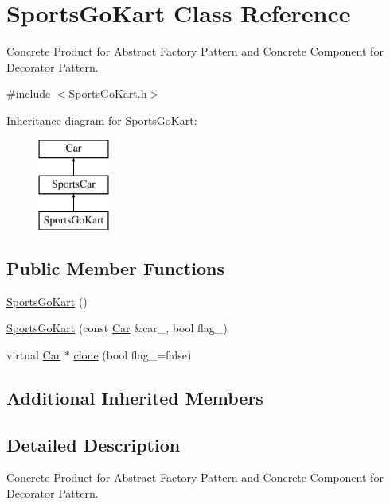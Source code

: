 \hypertarget{class_sports_go_kart}{}\section{Sports\+Go\+Kart Class Reference}
\label{class_sports_go_kart}


Concrete Product for Abstract Factory Pattern and Concrete Component for Decorator Pattern.  




{\ttfamily \#include $<$Sports\+Go\+Kart.\+h$>$}

Inheritance diagram for Sports\+Go\+Kart\+:\begin{figure}[H]
\begin{center}
\leavevmode
\includegraphics[height=3.000000cm]{class_sports_go_kart}
\end{center}
\end{figure}
\subsection*{Public Member Functions}
\begin{DoxyCompactItemize}
\item 
\mbox{\hyperlink{class_sports_go_kart_af94667e853606eda8def4ebe200e770c}{Sports\+Go\+Kart}} ()
\item 
\mbox{\hyperlink{class_sports_go_kart_a240ef3c603140c844f1a0fb8becd19be}{Sports\+Go\+Kart}} (const \mbox{\hyperlink{class_car}{Car}} \&car\+\_\+, bool flag\+\_\+)
\item 
virtual \mbox{\hyperlink{class_car}{Car}} $\ast$ \mbox{\hyperlink{class_sports_go_kart_abff0ab942e347968f49a3ebf600b19fe}{clone}} (bool flag\+\_\+=false)
\end{DoxyCompactItemize}
\subsection*{Additional Inherited Members}


\subsection{Detailed Description}
Concrete Product for Abstract Factory Pattern and Concrete Component for Decorator Pattern. 

